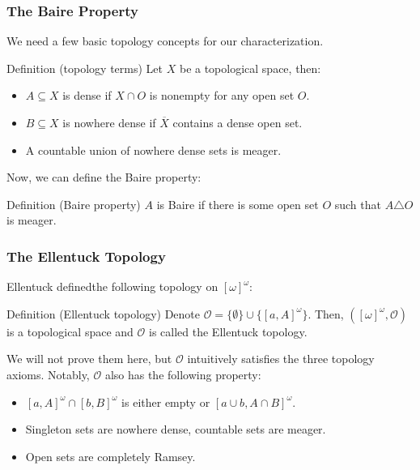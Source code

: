 \documentclass[handout]{beamer}
\begin{document}
\begin{frame}
\frametitle{The Baire Property}
We need a few basic topology concepts for our characterization.  \pause
\begin{block}{Definition (topology terms)}
Let $X$ be a topological space, then:
\begin{itemize}
    \item $A\subseteq X$ is \alert{dense} if $X\cap O$ is nonempty for any open set $O$.
    \item $B\subseteq X$ is \alert{nowhere dense} if $\overline{X}$ contains a dense open set.
    \item A countable union of nowhere dense sets is \alert{meager}.
\end{itemize}
\end{block}
\pause
Now, we can define the Baire property: \pause
\begin{block}{Definition (Baire property)}
$A$ is \alert{Baire} if there is some open set $O$ such that $A\triangle O$ is meager. 
\end{block}
\end{frame}

\begin{frame}
\frametitle{The Ellentuck Topology}
Ellentuck defined\footnotemark the following topology on $[\omega]^\omega$: 
\begin{block}{Definition (Ellentuck topology)}
Denote $\mathcal{O}=\{\emptyset\}\cup\{[a,A]^\omega\}$. Then, $([\omega]^\omega, \mathcal{O})$ is a topological space and $\mathcal{O}$ is called the \alert{Ellentuck topology}. 
\end{block}
\pause
We will not prove them here, but $\mathcal{O}$ intuitively satisfies the three topology axioms. Notably, $\mathcal{O}$ also has the following property:
\begin{itemize}
    \item $[a,A]^\omega\cap[b,B]^\omega$ is either empty or $[a\cup b,A\cap B]^\omega$. 
    \item Singleton sets are nowhere dense, countable sets are meager. 
    \item Open sets are completely Ramsey. 
\end{itemize}
\end{frame}
\end{document}
